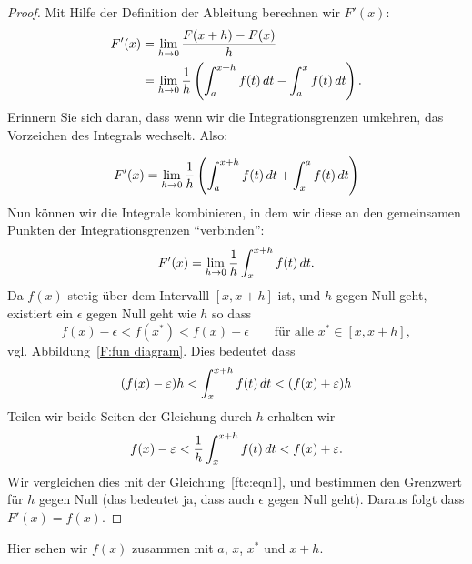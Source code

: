 \begin{proof}
Mit Hilfe der Definition der Ableitung berechnen wir $F'(x)$:
\begin{align*}
F'(x) &= \lim_{h\to 0}\frac{F(x+h)-F(x)}{h}\\ 
&=\lim_{h\to 0}\frac{1}{h}\left( \int_a^{x+h} f(t)\, d t - \int_a^x f(t)\, d t\right).
\end{align*}
Erinnern Sie sich daran, dass wenn wir die Integrationsgrenzen umkehren, das Vorzeichen des Integrals wechselt. Also:


\[
F'(x) =\lim_{h\to 0} \frac{1}{h}\left( \int_a^{x+h} f(t)\, d t + \int_x^a f(t)\, d t\right)
\]
Nun können wir die Integrale kombinieren, in dem wir diese an den gemeinsamen Punkten der Integrationsgrenzen ``verbinden'':
\begin{equation}\label{ftc:eqn1}
F'(x)=\lim_{h\to 0} \frac{1}{h}\int_x^{x+h} f(t)\, d t.
\end{equation}
Da $f(x)$ stetig über dem Intervalll $[x,x+h]$ ist, und  $h$ gegen Null geht, 
existiert ein $\epsilon$ gegen Null geht wie $h$ so dass
\[
f(x)-\epsilon < f(x^*) < f(x) + \epsilon \qquad \text{für alle }x^*\in[x,x+h],
\]
vgl. Abbildung~\ref{F:fun diagram}. Dies bedeutet dass
\[
(f(x) - \varepsilon)h < \int_x^{x+h} f(t)\, d t < (f(x) + \varepsilon)h
\]
Teilen wir beide Seiten der Gleichung durch $h$ erhalten wir
\[
f(x) - \varepsilon < \frac{1}{h}\int_x^{x+h} f(t)\, d t < f(x) + \varepsilon.
\]
Wir vergleichen dies mit der Gleichung~\ref{ftc:eqn1}, und bestimmen den Grenzwert für $h$ gegen Null (das bedeutet ja, dass auch $\epsilon$ gegen Null geht). Daraus folgt dass $F'(x) = f(x)$.
\end{proof}

\begin{marginfigure}
\caption{Hier sehen wir $f(x)$ zusammen mit $a$, $x$, $x^*$ und $x+h$.}
\label{F:fun diagram}
\end{marginfigure}

